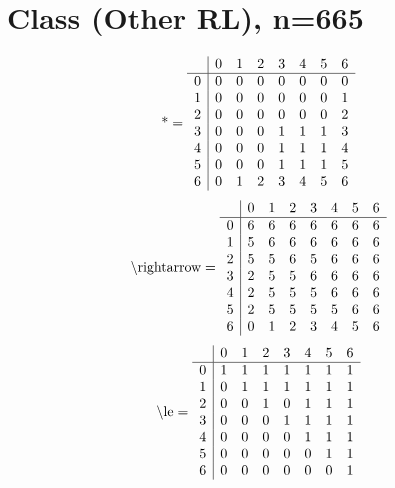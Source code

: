 \documentclass[11pt]{article}
\begin{document}
\section{Class (Other RL), n=665}
\[\text{*} = 
\begin{array}{r | r r r r r r r}
 & 0 & 1 & 2 & 3 & 4 & 5 & 6 \\ \hline
0 & 0 & 0 & 0 & 0 & 0 & 0 & 0 \\
1 & 0 & 0 & 0 & 0 & 0 & 0 & 1 \\
2 & 0 & 0 & 0 & 0 & 0 & 0 & 2 \\
3 & 0 & 0 & 0 & 1 & 1 & 1 & 3 \\
4 & 0 & 0 & 0 & 1 & 1 & 1 & 4 \\
5 & 0 & 0 & 0 & 1 & 1 & 1 & 5 \\
6 & 0 & 1 & 2 & 3 & 4 & 5 & 6 \\
\end{array}
\]
\[\text{\textbackslash rightarrow} = 
\begin{array}{r | r r r r r r r}
 & 0 & 1 & 2 & 3 & 4 & 5 & 6 \\ \hline
0 & 6 & 6 & 6 & 6 & 6 & 6 & 6 \\
1 & 5 & 6 & 6 & 6 & 6 & 6 & 6 \\
2 & 5 & 5 & 6 & 5 & 6 & 6 & 6 \\
3 & 2 & 5 & 5 & 6 & 6 & 6 & 6 \\
4 & 2 & 5 & 5 & 5 & 6 & 6 & 6 \\
5 & 2 & 5 & 5 & 5 & 5 & 6 & 6 \\
6 & 0 & 1 & 2 & 3 & 4 & 5 & 6 \\
\end{array}
\]
\[\text{\textbackslash le} = 
\begin{array}{r | r r r r r r r}
 & 0 & 1 & 2 & 3 & 4 & 5 & 6 \\ \hline
0 & 1 & 1 & 1 & 1 & 1 & 1 & 1 \\
1 & 0 & 1 & 1 & 1 & 1 & 1 & 1 \\
2 & 0 & 0 & 1 & 0 & 1 & 1 & 1 \\
3 & 0 & 0 & 0 & 1 & 1 & 1 & 1 \\
4 & 0 & 0 & 0 & 0 & 1 & 1 & 1 \\
5 & 0 & 0 & 0 & 0 & 0 & 1 & 1 \\
6 & 0 & 0 & 0 & 0 & 0 & 0 & 1 \\
\end{array}
\]
\end{document}
